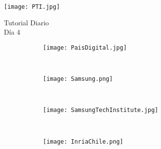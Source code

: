 \begin{titlepage} %
  \thispagestyle{empty} %
  \begin{flushleft} %
    \texttt{[image: PTI.jpg]}
  \end{flushleft}
  \vfill
  \vspace{2cm} %
  \begin{center} %
    {
      \Huge Tutorial Diario\\
      \huge Día 4
    }
  \end{center}

  \vspace{5cm}

  \begin{figure}[H]
    \centering
    \begin{subfigure}[b]{0.2\textwidth}
      \centering
      \texttt{[image: PaisDigital.jpg]}
      \label{fig:Viper}
    \end{subfigure}
    ~
    \begin{subfigure}[b]{0.4\textwidth}
      \centering
      \texttt{[image: Samsung.png]}
      \label{fig:Phyrex}
    \end{subfigure}
    ~
    \begin{subfigure}[b]{0.23\textwidth}
      \centering
      \texttt{[image: SamsungTechInstitute.jpg]}
      \label{fig:Viper}
    \end{subfigure}
    ~\\
    \begin{subfigure}[b]{0.4\textwidth}
      \centering
      \texttt{[image: InriaChile.png]}
      \label{fig:Phyrex}
    \end{subfigure}
  \end{figure}

  \vfill
\end{titlepage}
